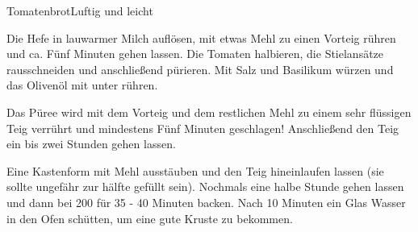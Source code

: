 \begin{recipe}{Tomatenbrot}{Luftig und leicht}
  \label{Tomatenbrot}
  \inglist
  
  \steps
  Die Hefe in lauwarmer Milch auflösen, mit etwas Mehl zu einen Vorteig rühren und ca.
  Fünf Minuten gehen lassen. Die Tomaten halbieren, die Stielansätze rausschneiden und
  anschließend pürieren. Mit Salz und Basilikum würzen und das Olivenöl mit unter rühren.

  Das Püree wird mit dem Vorteig und dem restlichen Mehl zu einem sehr flüssigen Teig
  verrührt und mindestens Fünf Minuten geschlagen! Anschließend den Teig ein bis zwei
  Stunden gehen lassen.

  Eine Kastenform mit Mehl ausstäuben und den Teig hineinlaufen lassen (sie sollte
  ungefähr zur hälfte gefüllt sein). Nochmals eine halbe Stunde gehen lassen und dann bei
  200 \celsius für 35 - 40 Minuten backen. Nach 10 Minuten ein Glas Wasser in den Ofen
  schütten, um eine gute Kruste zu bekommen.
\end{recipe}
